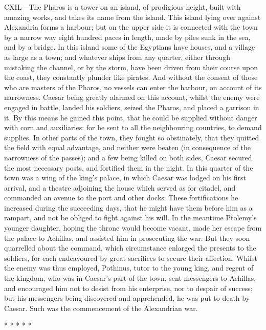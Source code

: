 CXIL—The Pharos is a tower on an island, of prodigious height, built
with amazing works, and takes its name from the island. This island
lying over against Alexandria forms a harbour; but on the upper side it
is connected with the town by a narrow way eight hundred paces in
length, made by piles sunk in the sea, and by a bridge. In this island
some of the Egyptians have houses, and a village as large as a town; and
whatever ships from any quarter, either through mistaking the channel,
or by the storm, have been driven from their course upon the coast, they
constantly plunder like pirates. And without the consent of those who
are masters of the Pharos, no vessels can enter the harbour, on account
of its narrowness. Caesar being greatly alarmed on this account, whilst
the enemy were engaged in battle, landed his soldiers, seized the
Pharos, and placed a garrison in it. By this means he gained this point,
that he could be supplied without danger with corn and auxiliaries: for
he sent to all the neighbouring countries, to demand supplies. In other
parts of the town, they fought so obstinately, that they quitted the
field with equal advantage, and neither were beaten (in consequence of
the narrowness of the passes); and a few being killed on both sides,
Caesar secured the most necessary posts, and fortified them in the
night. In this quarter of the town was a wing of the king's palace, in
which Caesar was lodged on his first arrival, and a theatre adjoining
the house which served as for citadel, and commanded an avenue to the
port and other docks. These fortifications he increased during the
succeeding days, that he might have them before him as a rampart, and
not be obliged to fight against his will. In the meantime Ptolemy's
younger daughter, hoping the throne would become vacant, made her escape
from the palace to Achillas, and assisted him in prosecuting the war.
But they soon quarrelled about the command, which circumstance enlarged
the presents to the soldiers, for each endeavoured by great sacrifices
to secure their affection. Whilst the enemy was thus employed, Pothinus,
tutor to the young king, and regent of the kingdom, who was in Caesar's
part of the town, sent messengers to Achillas, and encouraged him not to
desist from his enterprise, nor to despair of success; but his
messengers being discovered and apprehended, he was put to death by
Caesar. Such was the commencement of the Alexandrian war.

* * * * *
